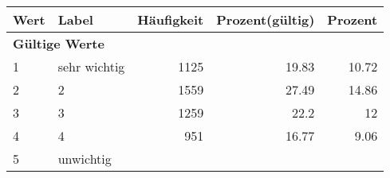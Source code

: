      \begin{longtable}{lXrrr}
     \toprule
     \textbf{Wert} & \textbf{Label} & \textbf{Häufigkeit} & \textbf{Prozent(gültig)} & \textbf{Prozent} \\
     \endhead
     \midrule
     \multicolumn{5}{l}{\textbf{Gültige Werte}}\\

     1 &
     \multicolumn{1}{X}{ sehr wichtig   } &


       \num{1125} &
       \num[round-mode=places,round-precision=2]{19.83} &
         \num[round-mode=places,round-precision=2]{10.72} \\

     2 &
     \multicolumn{1}{X}{ 2   } &


       \num{1559} &
       \num[round-mode=places,round-precision=2]{27.49} &
         \num[round-mode=places,round-precision=2]{14.86} \\

     3 &
     \multicolumn{1}{X}{ 3   } &


       \num{1259} &
       \num[round-mode=places,round-precision=2]{22.2} &
         \num[round-mode=places,round-precision=2]{12} \\

     4 &
     \multicolumn{1}{X}{ 4   } &


       \num{951} &
       \num[round-mode=places,round-precision=2]{16.77} &
         \num[round-mode=places,round-precision=2]{9.06} \\

     5 &
     \multicolumn{1}{X}{ unwichtig   } &



\end{longtable}

